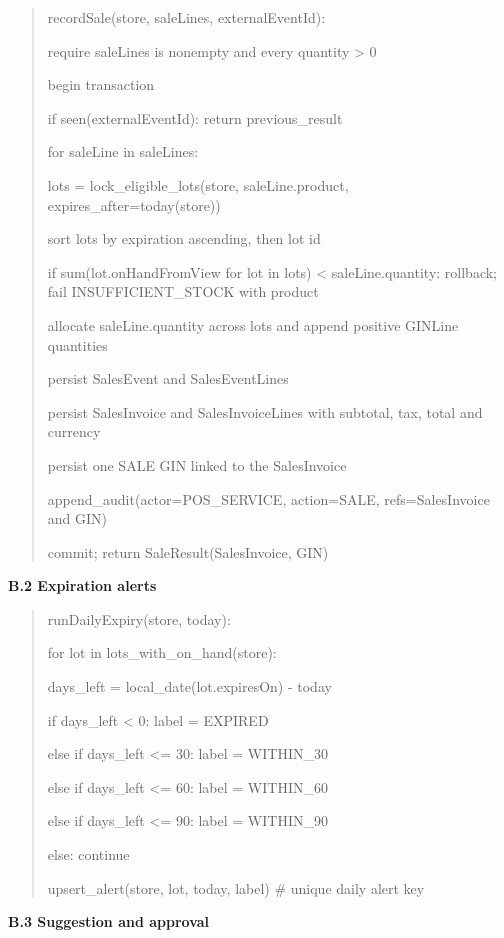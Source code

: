 \begin{quote}
recordSale(store, saleLines, externalEventId):

require saleLines is nonempty and every quantity \textgreater{} 0

begin transaction

if seen(externalEventId): return previous\_result

for saleLine in saleLines:

lots = lock\_eligible\_lots(store, saleLine.product, expires\_after=today(store))

sort lots by expiration ascending, then lot id

if sum(lot.onHandFromView for lot in lots) \textless{} saleLine.quantity: rollback; fail INSUFFICIENT\_STOCK with product

allocate saleLine.quantity across lots and append positive GINLine quantities

persist SalesEvent and SalesEventLines

persist SalesInvoice and SalesInvoiceLines with subtotal, tax, total and currency

persist one SALE GIN linked to the SalesInvoice

append\_audit(actor=POS\_SERVICE, action=SALE, refs=SalesInvoice and GIN)

commit; return SaleResult(SalesInvoice, GIN)
\end{quote}

\textbf{B.2 Expiration alerts}

\begin{quote}
runDailyExpiry(store, today):

for lot in lots\_with\_on\_hand(store):

days\_left = local\_date(lot.expiresOn) - today

if days\_left \textless{} 0: label = EXPIRED

else if days\_left \textless= 30: label = WITHIN\_30

else if days\_left \textless= 60: label = WITHIN\_60

else if days\_left \textless= 90: label = WITHIN\_90

else: continue

upsert\_alert(store, lot, today, label) \# unique daily alert key
\end{quote}

\textbf{B.3 Suggestion and approval}

